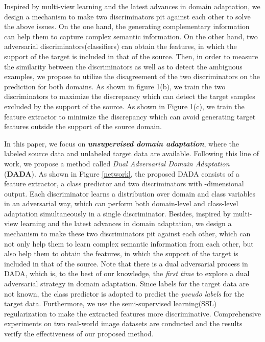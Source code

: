 \documentclass{ecai}
\begin{document}
Inspired by multi-view learning and the latest advances in domain adaptation\cite{b19,b24,b31}, we design a mechanism to make two discriminators pit against each other to solve the above issues. On the one hand, the generating complementary information can help them to capture complex semantic information. On the other hand, two adversarial discriminators(classifiers) can obtain the features, in which the support of the target is included in that of the source. Then, in order to measure the similarity between the discriminators as well as to detect the ambiguous examples, we propose to utilize the disagreement of the two discriminators on the prediction for both domains. As shown in figure 1(b), we train the two discriminators to maximize the discrepancy which can detect the target samples excluded by the support of the source.  As shown in Figure 1(c),  we train the feature extractor to minimize the discrepancy which can avoid generating target features outside the support of the source domain.

In this paper,  we focus on \textbf{{\emph{unsupervised domain adaptation}}}, where the labeled source data and unlabeled target data are available. Following this line of work, we propose a method called {{\emph{Dual Adversarial Domain Adaptation}}} (\textbf{DADA}).  As shown in Figure \ref{network}, the proposed DADA consists of a feature extractor, a class predictor and two discriminators with -dimensional output. Each discriminator learns a distribution over domain and class variables in an adversarial way, which can perform both domain-level and class-level adaptation simultaneously in a single discriminator. Besides, inspired by multi-view learning and the latest advances in domain adaptation\cite{b19,b24,b31}, we design a mechanism to make these two discriminators pit against each other, which can not only help them to learn complex semantic information from each other, but also help them to obtain the features, in which the support of the target is included in that of the source.
Note that there is a dual adversarial process in DADA, which is, to the best of our knowledge, the {\emph{first time}} to explore a dual adversarial strategy in domain adaptation. Since labels for the target data are not known, the class predictor is adopted to predict the {\emph{pseudo labels}} for the target data. Furthermore, we use the semi-supervised learning(SSL) regularization to make the extracted features more discriminative. Comprehensive experiments on two real-world image datasets are conducted and the results verify the effectiveness of our proposed method.
\end{document}
